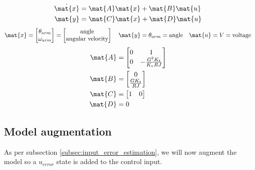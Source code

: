 \begin{theorem}
  \begin{align*}
    \dot{\mat{x}} &= \mat{A} \mat{x} + \mat{B} \mat{u} \\
    \mat{y} &= \mat{C} \mat{x} + \mat{D} \mat{u}
  \end{align*}
  \begin{equation*}
    \mat{x} =
    \begin{bmatrix}
      \theta_{arm} \\
      \omega_{arm}
    \end{bmatrix} =
    \begin{bmatrix}
      \text{angle} \\
      \text{angular velocity}
    \end{bmatrix}
    \quad
    \mat{y} = \theta_{arm} = \text{angle}
    \quad
    \mat{u} = V = \text{voltage}
  \end{equation*}
  \begin{align}
    \mat{A} &=
    \begin{bmatrix}
      0 & 1 \\
      0 & -\frac{G^2 K_t}{K_v RJ}
    \end{bmatrix} \\
    \mat{B} &=
    \begin{bmatrix}
      0 \\
      \frac{G K_t}{RJ}
    \end{bmatrix} \\
    \mat{C} &=
    \begin{bmatrix}
      1 & 0
    \end{bmatrix} \\
    \mat{D} &= 0
  \end{align}
\end{theorem}

\subsection{Model augmentation}

As per subsection \ref{subsec:input_error_estimation}, we will now augment the
\gls{model} so a $u_{error}$ state is added to the \gls{control input}.

